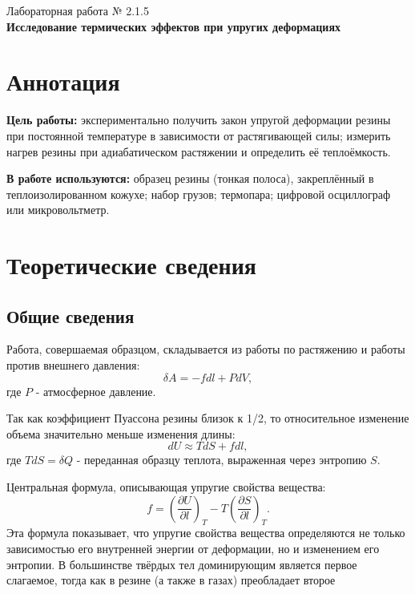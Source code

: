 \documentclass[a4paper,12pt]{article} %
\begin{document}
\begin{center}   
	\large{Лабораторная работа № 2.1.5\\\textbf{Исследование термических эффектов при упругих деформациях}}\\
\end{center}

\section{Аннотация}

\noindent\textbf{Цель работы:}
экспериментально получить закон упругой деформации резины при постоянной температуре в зависимости от растягивающей силы; измерить нагрев резины при адиабатическом растяжении и определить её теплоёмкость.
	
\smallskip
\noindent\textbf{В работе используются:}
образец резины (тонкая полоса), закреплённый в теплоизолированном кожухе; набор грузов; термопара; цифровой осциллограф или микровольтметр.

\section{Теоретические сведения}

\subsection*{Общие сведения}
Работа, совершаемая образцом, складывается из работы по растяжению и работы против внешнего давления:
\begin{equation}
\delta A = -fdl + PdV,
\end{equation}
где $P$ - атмосферное давление.

Так как коэффициент Пуассона резины близок к 1/2, то относительное изменение объема значительно меньше изменения длины:
\begin{equation}
dU \approx TdS + fdl,
\end{equation}
где $TdS = \delta Q$ - переданная образцу теплота, выраженная через энтропию $S$.

Центральная формула, описывающая упругие свойства вещества:
\begin{equation}
f = (\frac{\partial U}{\partial l})_T - T(\frac{\partial S}{\partial l})_T.
\end{equation}
Эта формула показывает, что упругие свойства вещества определяются не
только зависимостью его внутренней энергии от деформации, но и изменением его энтропии. В большинстве твёрдых тел доминирующим является первое слагаемое, тогда как в резине (а также в газах) преобладает второе
\end{document}
